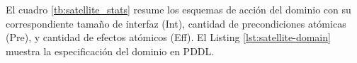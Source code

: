 El cuadro \ref{tb:satellite_stats} resume los esquemas de acción del dominio con
su correspondiente tamaño de interfaz (Int), cantidad de precondiciones atómicas
(Pre), y cantidad de efectos atómicos (Eff). El Listing
\ref{lst:satellite-domain} muestra la especificación del dominio en PDDL.

\begin{table}[h!]
    \centering
    \caption{Ejemplos etiquetados a partir de un plan relajado y una acción}
    \label{tb:satellite_stats}
\end{table}


